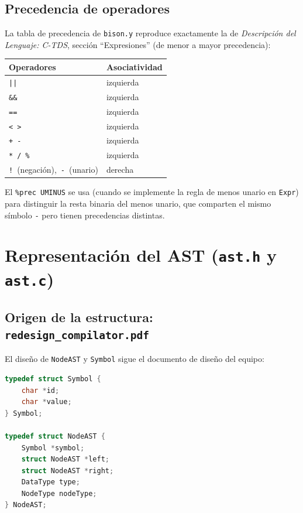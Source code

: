 \documentclass[11pt,a4paper]{article}
\begin{document}
\subsection{Precedencia de operadores}

La tabla de precedencia de \texttt{bison.y} reproduce exactamente la de
\emph{Descripci\'on del Lenguaje: C-TDS}, secci\'on ``Expresiones''
(de menor a mayor precedencia):

\begin{center}
\begin{tabular}{ll}
\hline
Operadores & Asociatividad \\
\hline
\texttt{||} & izquierda \\
\texttt{\&\&} & izquierda \\
\texttt{==} & izquierda \\
\texttt{<}\ \texttt{>} & izquierda \\
\texttt{+}\ \texttt{-} & izquierda \\
\texttt{*}\ \texttt{/}\ \texttt{\%} & izquierda \\
\texttt{!}\ (negaci\'on),\ \texttt{-}\ (unario) & derecha \\
\hline
\end{tabular}
\end{center}

El \texttt{\%prec UMINUS} se usa (cuando se implemente la regla de menos
unario en \texttt{Expr}) para distinguir la resta binaria del menos
unario, que comparten el mismo s\'imbolo \texttt{-} pero tienen
precedencias distintas.

\section{Representaci\'on del AST (\texttt{ast.h} y \texttt{ast.c})}

\subsection{Origen de la estructura: \texttt{redesign\_compilator.pdf}}

El dise\~no de \texttt{NodeAST} y \texttt{Symbol} sigue el documento de
dise\~no del equipo:

\begin{lstlisting}[language=C]
typedef struct Symbol {
    char *id;
    char *value;
} Symbol;

typedef struct NodeAST {
    Symbol *symbol;
    struct NodeAST *left;
    struct NodeAST *right;
    DataType type;
    NodeType nodeType;
} NodeAST;
\end{lstlisting}
\end{document}
